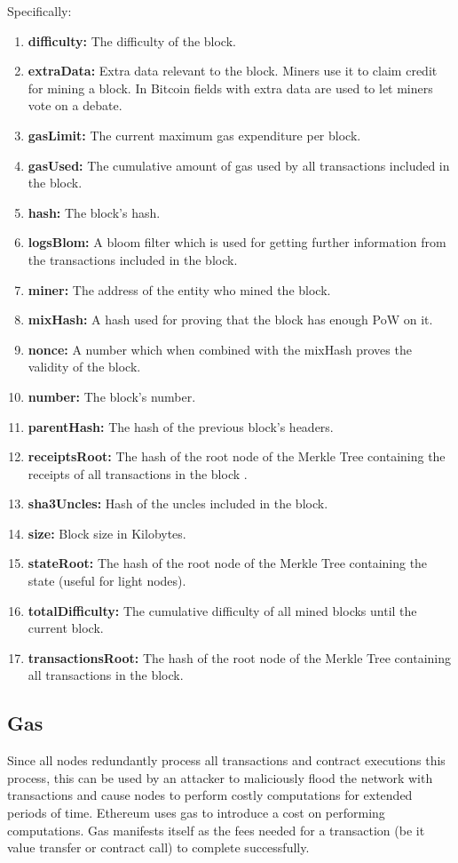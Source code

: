 Specifically:
\begin{enumerate}
    \item \textbf{difficulty:} The difficulty of the block.
    \item \textbf{extraData:} Extra data relevant to the block. Miners use it to claim credit for mining a block. In Bitcoin fields with extra data are used to let miners vote on a debate.
    \item \textbf{gasLimit:} The current maximum gas expenditure per block.
    \item \textbf{gasUsed:} The cumulative amount of gas used by all transactions included in the block.
    \item \textbf{hash:} The block's hash.
    \item \textbf{logsBlom:} A bloom filter which is used for getting further information from the transactions included in the block.
    \item \textbf{miner:} The address of the entity who mined the block.
    \item \textbf{mixHash:} A hash used for proving that the block has enough PoW on it.
    \item \textbf{nonce:} A number which when combined with the mixHash proves the validity of the block.
    \item \textbf{number:} The block's number.
    \item \textbf{parentHash:} The hash of the previous block's headers.
    \item \textbf{receiptsRoot:} The hash of the root node of the Merkle Tree containing the receipts of all transactions in the block .
    \item \textbf{sha3Uncles:} Hash of the uncles included in the block.
    \item \textbf{size:} Block size in Kilobytes.
    \item \textbf{stateRoot:} The hash of the root node of the Merkle Tree containing the state (useful for light nodes).
    \item \textbf{totalDifficulty:} The cumulative difficulty of all mined blocks until the current block.
    \item \textbf{transactionsRoot:} The hash of the root node of the Merkle Tree containing all transactions in the block. 
\end{enumerate}

\subsection{Gas} \label{gas}
Since all nodes redundantly process all transactions and contract executions this process, this can be used by an attacker to maliciously flood the network with transactions and cause nodes to perform costly computations for extended periods of time. Ethereum uses gas to introduce a cost on performing computations. Gas manifests itself as the fees needed for a transaction (be it value transfer or contract call) to complete successfully.

